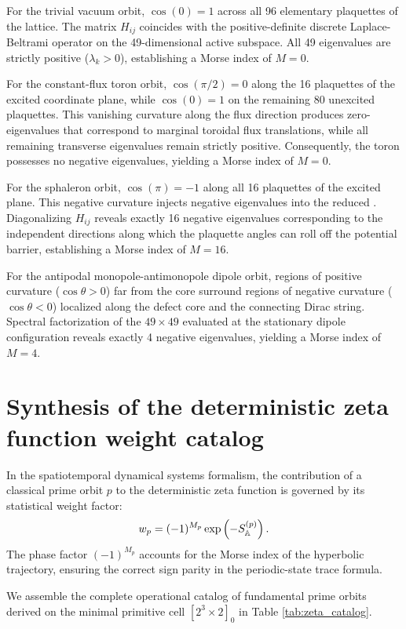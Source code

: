 \documentclass[11pt,a4paper]{article}
\begin{document}
For the trivial vacuum orbit, $\cos(0) = 1$ across all 96 elementary plaquettes of the lattice. The matrix $H_{ij}$ coincides with the positive-definite discrete Laplace-Beltrami operator on the 49-dimensional active subspace. All 49 eigenvalues are strictly positive ($\lambda_k > 0$), establishing a Morse index of $M = 0$.

For the constant-flux toron orbit, $\cos(\pi/2) = 0$ along the 16 plaquettes of the excited coordinate plane, while $\cos(0) = 1$ on the remaining 80 unexcited plaquettes. This vanishing curvature along the flux direction produces zero-eigenvalues that correspond to marginal toroidal flux translations, while all remaining transverse eigenvalues remain strictly positive. Consequently, the toron possesses no negative eigenvalues, yielding a Morse index of $M = 0$.

For the sphaleron orbit, $\cos(\pi) = -1$ along all 16 plaquettes of the excited plane. This negative curvature injects negative eigenvalues into the reduced {\jacobianOrb}. Diagonalizing $H_{ij}$ reveals exactly 16 negative eigenvalues corresponding to the independent directions along which the plaquette angles can roll off the potential barrier, establishing a Morse index of $M = 16$.

For the antipodal monopole-antimonopole dipole orbit, regions of positive curvature ($\cos \theta > 0$) far from the core surround regions of negative curvature ($\cos \theta < 0$) localized along the defect core and the connecting Dirac string. Spectral factorization of the $49 \times 49$ {\jacobianOrb} evaluated at the stationary dipole configuration reveals exactly 4 negative eigenvalues, yielding a Morse index of $M = 4$.

\section{Synthesis of the deterministic zeta function weight catalog}

In the spatiotemporal dynamical systems formalism, the contribution of a classical prime orbit $p$ to the deterministic zeta function is governed by its statistical weight factor:
\begin{equation}
w_p = (-1)^{M_p} \exp\left(-S_{\mathbb{A}}^{(p)}\right).
\end{equation}
The phase factor $(-1)^{M_p}$ accounts for the Morse index of the hyperbolic trajectory, ensuring the correct sign parity in the periodic-state trace formula.

We assemble the complete operational catalog of fundamental prime orbits derived on the minimal primitive cell $[2^3 \times 2]_0$ in Table \ref{tab:zeta_catalog}.
\end{document}
